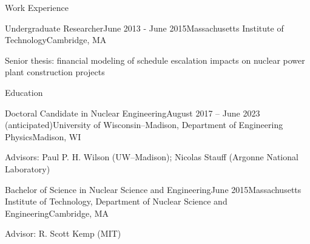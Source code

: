 \documentclass{resume} %
\begin{document}
\begin{rSection}{Work Experience}

\begin{rSubsection}{Undergraduate Researcher}{June 2013 - June 2015}{Massachusetts Institute of Technology}{Cambridge, MA}
  \setlength{\itemsep}{-3pt}
  \item Senior thesis: financial modeling of schedule escalation impacts on nuclear power plant construction projects
\end{rSubsection}

\end{rSection}



\begin{rSection}{Education}

\begin{rSubsection}{Doctoral Candidate in Nuclear Engineering}{August 2017 -- June 2023 (anticipated)}{University of Wisconsin--Madison, Department of Engineering Physics}{Madison, WI}
  \item Advisors: Paul P. H. Wilson (UW--Madison); Nicolas Stauff (Argonne National Laboratory)
\end{rSubsection}

\begin{rSubsection}{Bachelor of Science in Nuclear Science and Engineering}{June 2015}{Massachusetts Institute of Technology, Department of Nuclear Science and Engineering}{Cambridge, MA}
  \item Advisor: R. Scott Kemp (MIT)
\end{rSubsection}

\end{rSection}







\end{document}
